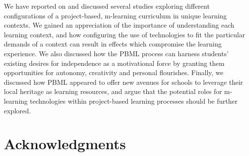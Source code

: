 \documentclass[,hyphens]{sigchi}
\begin{document}
We have reported on and discussed several studies exploring different configurations of a project-based, m-learning curriculum in unique learning contexts. We gained an appreciation of the importance of understanding each learning context, and how configuring the use of technologies to fit the particular demands of a context can result in effects which compromise the learning experience. We also discussed how the PBML process can harness students' existing desires for independence as a motivational force by granting them opportunities for autonomy, creativity and personal flourishes. Finally, we discussed how PBML appeared to offer new avenues for schools to leverage their local heritage as learning resources, and argue that the potential roles for m-learning technologies within project-based learning processes should be further explored.

\section{Acknowledgments}

\balance{}



\end{document}
